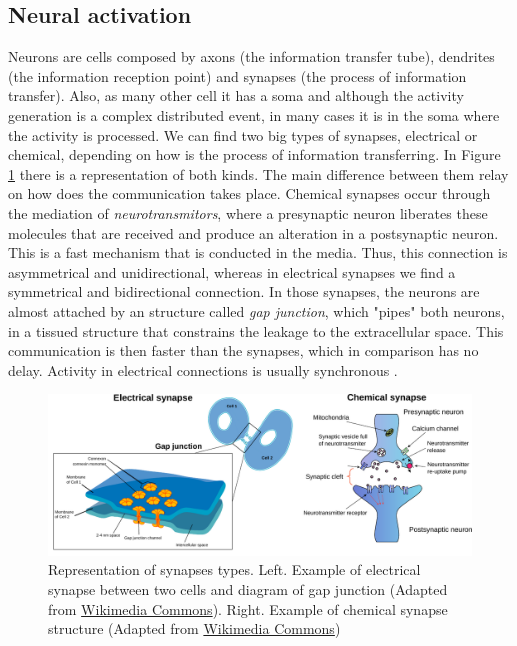 \subsection{Neural activation}
Neurons are cells composed by axons (the information transfer tube), dendrites (the information reception point) and synapses (the process of information transfer). Also, as many other cell it has a soma and although the activity generation is a complex distributed event, in many cases it is in the soma where the activity is processed. We can find two big types of synapses, electrical or chemical, depending on how is the process of information transferring. In Figure \ref{fig:synapse-types} there is a representation of both kinds. The main difference between them relay on how does the communication takes place. Chemical synapses occur through the mediation of \textit{neurotransmitors}, where a presynaptic neuron liberates these molecules that are received and produce an alteration in a postsynaptic neuron. This is a fast mechanism that is conducted in the media. Thus, this connection is asymmetrical and unidirectional, whereas in electrical synapses we find a symmetrical and bidirectional connection. In those synapses, the neurons are almost attached by an structure called \textit{gap junction}, which "pipes" both neurons, in a tissued structure that constrains the leakage to the extracellular space. This communication is then faster than the synapses, which in comparison has no delay. Activity in electrical connections is usually synchronous \parencite{levitan_neuron_2002}.

\begin{figure}[hbt!]
    \centering
    \includegraphics[width=\linewidth]{img/intro/synapses.pdf}
    \caption{Representation of synapses types. Left. Example of electrical synapse between two cells and diagram of gap junction (Adapted from \href{https://commons.wikimedia.org/wiki/File:Gap_cell_junction-en.svg}{Wikimedia Commons}). Right. Example of chemical synapse structure (Adapted from \href{https://commons.wikimedia.org/wiki/File:Synapse_diag1.svg}{Wikimedia Commons})}
    \label{fig:synapse-types}
\end{figure}

